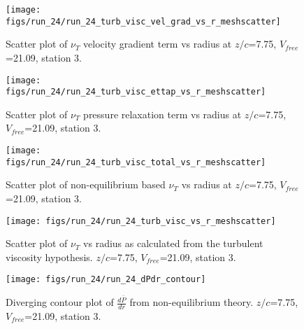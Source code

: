 \begin{figure}[H]
\centering
\texttt{[image: figs/run\_24/run\_24\_turb\_visc\_vel\_grad\_vs\_r\_meshscatter]}
\caption{Scatter plot of $\nu_T$ velocity gradient term vs radius at $z/c$=7.75, $V_{free}$=21.09, station 3.}
\end{figure}


\begin{figure}[H]
\centering
\texttt{[image: figs/run\_24/run\_24\_turb\_visc\_ettap\_vs\_r\_meshscatter]}
\caption{Scatter plot of $\nu_T$ pressure relaxation term vs radius at $z/c$=7.75, $V_{free}$=21.09, station 3.}
\end{figure}


\begin{figure}[H]
\centering
\texttt{[image: figs/run\_24/run\_24\_turb\_visc\_total\_vs\_r\_meshscatter]}
\caption{Scatter plot of non-equilibrium based $\nu_T$ vs radius at $z/c$=7.75, $V_{free}$=21.09, station 3.}
\end{figure}


\begin{figure}[H]
\centering
\texttt{[image: figs/run\_24/run\_24\_turb\_visc\_vs\_r\_meshscatter]}
\caption{Scatter plot of $\nu_T$ vs radius as calculated from the turbulent viscosity hypothesis. $z/c$=7.75, $V_{free}$=21.09, station 3.}
\end{figure}


\begin{figure}[H]
\centering
\texttt{[image: figs/run\_24/run\_24\_dPdr\_contour]}
\caption{Diverging contour plot of $\frac{d\bar{P}}{dr}$ from non-equilibrium theory. $z/c$=7.75, $V_{free}$=21.09, station 3.}
\end{figure}


